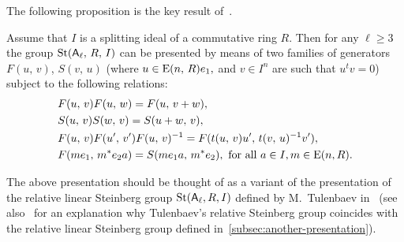The following proposition is the key result of~\cite{LS17}.
\begin{prop}
    \label{prop:rel-presentation}
    Assume that $I$ is a splitting ideal of a commutative ring $R$.
    Then for any $\ell\geq 3$ the group $\operatorname{St}(\mathsf{A}_\ell,\,R,\,I)$ can be presented by means of two families of generators $F(u,\,v)$, $S(v,\,u)$
    (where $u\in \operatorname{E}(n,\,R)e_1,$ and $v\in I^n$ are such that $u^{t}v=0$) subject to the following relations:
    \begin{align}
        &F(u,\,v)F(u,\,w)=F(u,\,v+w), \label{add4}\\
        &S(u,\,v)S(w,\,v)=S(u+w,\,v), \label{add5}\\
        &F(u,\,v)F(u',\,v')F(u,\,v)^{-1}=F(t(u,\,v)u',\,t(v,\,u)^{-1} v'), \label{conj3} \\
        &F(me_1,\,m^{*}e_{2}a)=S(me_{1}a,\,m^{*}e_{2}),\ \text{for all $a\in I$,}\, m \in \operatorname{E}(n, R). \label{coef-move}
    \end{align}
\end{prop}
The above presentation should be thought of as a variant of the presentation of
 the relative linear Steinberg group $\operatorname{St}(\mathsf{A}_\ell, R, I)$ defined by M.~Tulenbaev in~\cite[Definition~1.5]{Tu83}
 (see also~\cite[Proposition~8]{S15} for an explanation why Tulenbaev's relative Steinberg group coincides with
  the relative linear Steinberg group defined in~\cref{subsec:another-presentation}).
